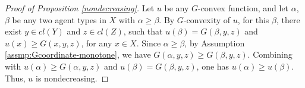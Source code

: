 \documentclass[a4paper, 11pt]{amsart}
\numberwithin{equation}{section}
\theoremstyle{plain}
\theoremstyle{definition}
\theoremstyle{remark}
\begin{document}
\vspace{0.3cm}


\begin{proof}[Proof of Proposition \ref{nondecreasing}]
	Let $u$ be any $G$-convex function, and let $\alpha$, $\beta$ be any two agent types in $X$ with $\alpha \ge \beta$. By $G$-convexity of $u$, for this $\beta$, there exist $y\in cl(Y)$ and $z \in cl(Z)$, such that $u(\beta)=G(\beta, y,z)$ and $u(x)\ge G(x, y,z)$, for any $x\in X$. Since $\alpha \ge \beta$, by Assumption \ref{assmp:Gcoordinate-monotone}, we have $G(\alpha, y,z)\ge G(\beta,y,z)$. Combining with $u(\alpha)\ge G(\alpha, y,z)$ and $u(\beta) = G(\beta,y,z)$, one has $u(\alpha) \ge u(\beta)$. Thus, $u$ is nondecreasing.
\end{proof}

\vspace{0.3cm}
\end{document}
